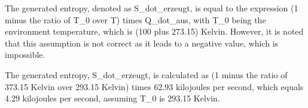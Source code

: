The generated entropy, denoted as S_dot_erzeugt, is equal to the expression (1 minus the ratio of T_0 over T) times Q_dot_aus, with T_0 being the environment temperature, which is (100 plus 273.15) Kelvin. However, it is noted that this assumption is not correct as it leads to a negative value, which is impossible.

The generated entropy, S_dot_erzeugt, is calculated as (1 minus the ratio of 373.15 Kelvin over 293.15 Kelvin) times 62.93 kilojoules per second, which equals 4.29 kilojoules per second, assuming T_0 is 293.15 Kelvin.